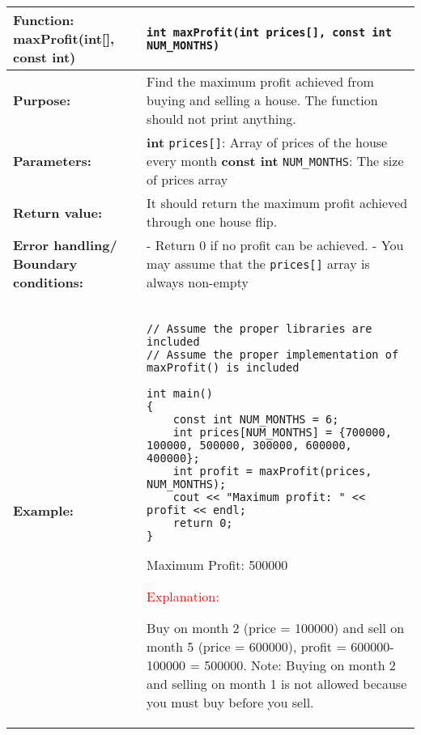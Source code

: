 \begin{longtable}[H]{|p{1.7in}|p{4.0in}|} \hline
        \textbf{Function:} \newline 
        maxProfit(int[], const int) & \texttt{int maxProfit(int prices[], const int NUM_MONTHS)}
        \\ \hline
        \textbf{Purpose:}  & Find the maximum profit achieved from buying and selling a house. The function should not print anything. \\ \hline
        \textbf{Parameters:} &  
        \textbf{int} \texttt{prices[]}: Array of prices of the house every month \newline
        \textbf{const int} \texttt{NUM\_MONTHS}: The size of prices array
\\ \hline
        \textbf{Return value:} &  It should return the maximum profit achieved through one house flip. \\ \hline
        \textbf{Error handling/} \newline
        \textbf{Boundary conditions:} & - Return 0 if no profit can be achieved. 
        \newline - You may assume that the \texttt{prices[]} array is always non-empty
        \\ \hline 
        \textbf{Example:} & 
        \begin{example}
        \begin{verbatim}
        
// Assume the proper libraries are included
// Assume the proper implementation of maxProfit() is included

int main()
{
    const int NUM_MONTHS = 6;
    int prices[NUM_MONTHS] = {700000, 100000, 500000, 300000, 600000, 400000};
    int profit = maxProfit(prices, NUM_MONTHS);
    cout << "Maximum profit: " << profit << endl;
    return 0;
}
        \end{verbatim}
        \end{example}

        \begin{sample}
Maximum Profit: 500000
        \end{sample}

        \textcolor{red}{Explanation:} 
        
        Buy on month 2 (price = 100000) and sell on month 5 (price = 600000), profit = 600000-100000 = 500000.
\newline Note: Buying on month 2 and selling on month 1 is not allowed because you must buy before you sell.

             \\ \hline
\end{longtable}

